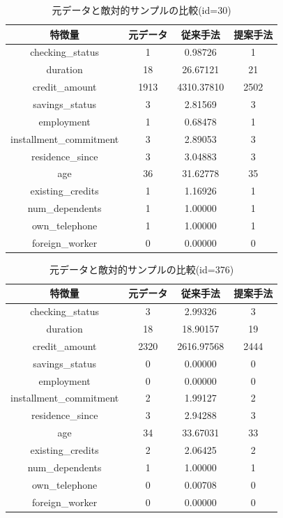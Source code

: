 \begin{table}[H]
    \centering
    \caption{元データと敵対的サンプルの比較(id=30)}
    \begin{tabular}{|c|c|c|c|} \hline
        特徴量 & 元データ & 従来手法 & 提案手法 \\ \hline
        checking\_status & 1 & 0.98726 & 1 \\ \hline
        duration & 18 & 26.67121 & 21 \\ \hline
        credit\_amount & 1913 & 4310.37810 & 2502 \\ \hline
        savings\_status & 3 & 2.81569 & 3 \\ \hline
        employment & 1 & 0.68478 & 1 \\ \hline
        installment\_commitment & 3 & 2.89053 & 3 \\ \hline
        residence\_since & 3 & 3.04883 & 3 \\ \hline
        age & 36 & 31.62778 & 35 \\ \hline
        existing\_credits & 1 & 1.16926 & 1 \\ \hline
        num\_dependents & 1 & 1.00000 & 1 \\ \hline
        own\_telephone & 1 & 1.00000 & 1 \\ \hline
        foreign\_worker & 0 & 0.00000 & 0 \\ \hline
    \end{tabular}
\end{table}

\begin{table}[H]
    \centering
    \caption{元データと敵対的サンプルの比較(id=376)}
    \begin{tabular}{|c|c|c|c|} \hline
        特徴量 & 元データ & 従来手法 & 提案手法 \\ \hline
        checking\_status & 3 & 2.99326 & 3 \\ \hline
        duration & 18 & 18.90157 & 19 \\ \hline
        credit\_amount & 2320 & 2616.97568 & 2444 \\ \hline
        savings\_status & 0 & 0.00000 & 0 \\ \hline
        employment & 0 & 0.00000 & 0 \\ \hline
        installment\_commitment & 2 & 1.99127 & 2 \\ \hline
        residence\_since & 3 & 2.94288 & 3 \\ \hline
        age & 34 & 33.67031 & 33 \\ \hline
        existing\_credits & 2 & 2.06425 & 2 \\ \hline
        num\_dependents & 1 & 1.00000 & 1 \\ \hline
        own\_telephone & 0 & 0.00708 & 0 \\ \hline
        foreign\_worker & 0 & 0.00000 & 0 \\ \hline
    \end{tabular}
\end{table}

